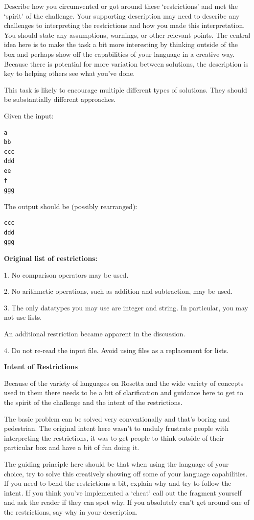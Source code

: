 \begin{itemize}
Describe how you circumvented or got around these `restrictions' and met
the `spirit' of the challenge. Your supporting description may need to
describe any challenges to interpreting the restrictions and how you
made this interpretation. You should state any assumptions, warnings, or
other relevant points. The central idea here is to make the task a bit
more interesting by thinking outside of the box and perhaps show off the
capabilities of your language in a creative way. Because there is
potential for more variation between solutions, the description is key
to helping others see what you've done.

This task is likely to encourage multiple different types of solutions.
They should be substantially different approaches.

Given the input:

\begin{verbatim}
a
bb
ccc
ddd
ee
f
ggg
\end{verbatim}

The output should be (possibly rearranged):

\begin{verbatim}
ccc
ddd
ggg
\end{verbatim}

\textbf{Original list of restrictions:}

1. No comparison operators may be used.

2. No arithmetic operations, such as addition and subtraction, may be
used.

3. The only datatypes you may use are integer and string. In particular,
you may not use lists.

An additional restriction became apparent in the discussion.

4. Do not re-read the input file. Avoid using files as a replacement for
lists.

\textbf{Intent of Restrictions}

Because of the variety of languages on Rosetta and the wide variety of
concepts used in them there needs to be a bit of clarification and
guidance here to get to the spirit of the challenge and the intent of
the restrictions.

The basic problem can be solved very conventionally and that's boring
and pedestrian. The original intent here wasn't to unduly frustrate
people with interpreting the restrictions, it was to get people to think
outside of their particular box and have a bit of fun doing it.

The guiding principle here should be that when using the language of
your choice, try to solve this creatively showing off some of your
language capabilities. If you need to bend the restrictions a bit,
explain why and try to follow the intent. If you think you've
implemented a `cheat' call out the fragment yourself and ask the reader
if they can spot why. If you absolutely can't get around one of the
restrictions, say why in your description.


\end{itemize}

